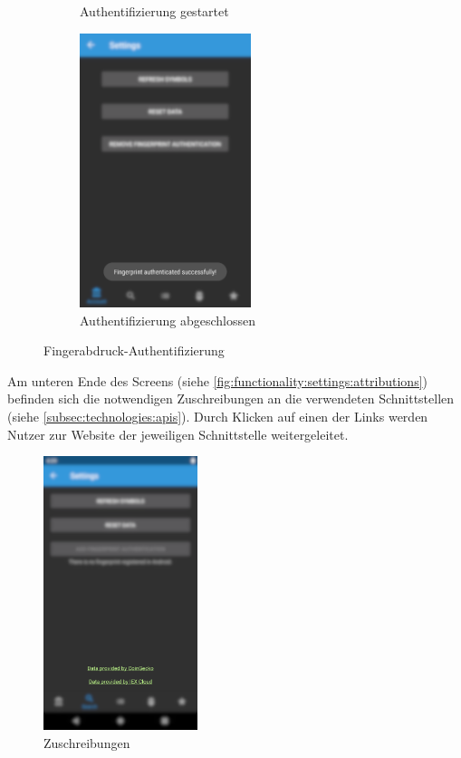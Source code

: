 \documentclass[a4paper]{article}
\begin{document}
\begin{figure}[H]
\begin{subfigure}{.5\textwidth}
        \caption{Authentifizierung gestartet}
        \label{fig:functionality:settings:fingerprint:requested}
    \end{subfigure}
    \begin{subfigure}{.5\textwidth}
        \centering
        \includegraphics[height=8cm,keepaspectratio]{./images/settings/fingerprint_add_done.png}
        \caption{Authentifizierung abgeschlossen}
        \label{fig:functionality:settings:fingerprint:done}
    \end{subfigure}
    \caption{Fingerabdruck-Authentifizierung}
    \label{fig:functionality:settings:fingerprint}
\end{figure}


Am unteren Ende des Screens (siehe \autoref{fig:functionality:settings:attributions}) befinden sich die notwendigen Zuschreibungen an die verwendeten Schnittstellen (siehe \autoref{subsec:technologies:apis}).
Durch Klicken auf einen der Links werden Nutzer zur Website der jeweiligen Schnittstelle weitergeleitet.

\begin{figure}[H]
    \centering
    \includegraphics[width=.5\textwidth,height=8cm,keepaspectratio]{./images/settings/attribution.png}
    \caption{Zuschreibungen}
    \label{fig:functionality:settings:attributions}
\end{figure}
\end{document}
